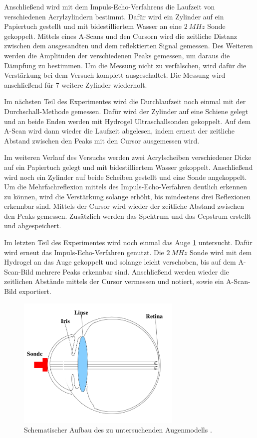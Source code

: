 Anschließend wird mit dem Impuls-Echo-Verfahrens die Laufzeit von verschiedenen
Acrylzylindern bestimmt. Dafür wird ein Zylinder auf ein Papiertuch gestellt und
mit bidestilliertem Wasser an eine $\SI{2}{MHz}$ Sonde gekoppelt. Mittels eines
A-Scans und den Cursorn wird die zeitliche Distanz zwischen dem ausgesandten und
dem reflektierten Signal gemessen.
Des Weiteren werden die Amplituden der verschiedenen Peaks gemessen, um
daraus die Dämpfung zu bestimmen. Um die Messung nicht zu verfälschen, wird dafür
die Verstärkung bei dem Versuch komplett ausgeschaltet. Die Messung wird anschließend
für 7 weitere Zylinder wiederholt.

Im nächsten Teil des Experimentes wird die Durchlaufzeit noch einmal mit der
Durchschall-Methode gemessen. Dafür wird der Zylinder auf eine Schiene gelegt und
an beide Enden werden mit Hydrogel Ultraschallsonden gekoppelt. Auf dem
A-Scan wird dann wieder die Laufzeit abgelesen, indem erneut der zeitliche
Abstand zwischen den Peaks mit den Cursor ausgemessen wird.

Im weiteren Verlauf des Versuchs werden zwei Acrylscheiben verschiedener Dicke
auf ein Papiertuch gelegt und mit bidestilliertem Wasser gekoppelt. Anschließend
wird noch ein Zylinder auf beide Scheiben gestellt und eine Sonde angekoppelt.
Um die Mehrfachreflexion mittels des Impuls-Echo-Verfahren deutlich erkennen zu
können, wird die Verstärkung
solange erhöht, bis mindestens drei Reflexionen erkennbar sind. Mittels der Cursor
wird wieder der zeitliche Abstand zwischen den Peaks gemessen. Zusätzlich werden
das Spektrum und das Cepstrum erstellt und abgespeichert.

Im letzten Teil des Experimentes wird noch einmal das Auge \ref{fig:Auge} untersucht. Dafür wird
erneut das Impuls-Echo-Verfahren genutzt. Die $\SI{2}{MHz}$ Sonde wird mit dem
Hydrogel an das Auge gekoppelt und solange leicht verschoben, bis auf dem A-Scan-Bild
mehrere Peaks erkennbar sind. Anschließend werden wieder die zeitlichen Abstände
mittels der Cursor vermessen und notiert, sowie ein A-Scan-Bild exportiert.

\begin{figure}
  \centering
  \includegraphics[width=0.7\textwidth]{Pics/Auge.png}
  \caption{Schematischer Aufbau des zu untersuchenden Augenmodells \cite{anleitung01}.}
  \label{fig:Auge}
\end{figure}
